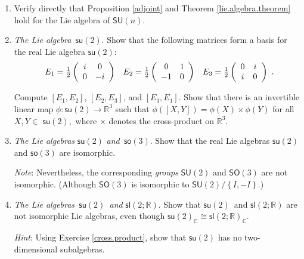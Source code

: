 \documentclass{amsbook}
\theoremstyle{plain}
\numberwithin{equation}{chapter}
\numberwithin{theorem}{chapter}
\begin{document}
\begin{enumerate}
\item  Verify directly that Proposition \ref{adjoint} and Theorem
\ref{lie.algebra.theorem} hold for the Lie algebra of $\mathsf{SU}(n)$.

\item \label{cross.product}\textit{The Lie algebra}\emph{\ }$\mathsf{su}(2)$.
Show that the following matrices form a basis for the real Lie algebra
$\mathsf{su}(2)$:
\[%
\begin{array}
[c]{ccc}%
E_{1}=\tfrac{1}{2}\left(
\begin{array}
[c]{cc}%
i & 0\\
0 & -i
\end{array}
\right)   & E_{2}=\tfrac{1}{2}\left(
\begin{array}
[c]{cc}%
0 & 1\\
-1 & 0
\end{array}
\right)   & E_{3}=\tfrac{1}{2}\left(
\begin{array}
[c]{cc}%
0 & i\\
i & 0
\end{array}
\right)
\end{array}
\text{.}%
\]

Compute $[E_{1},E_{2}]$, $[E_{2},E_{3}]$, and $[E_{3},E_{1}]$. Show that there
is an invertible linear map $\phi:\mathsf{su}(2)\rightarrow\mathbb{R}^{3}$
such that $\phi(\left[  X,Y\right]  )=\phi(X)\times\phi(Y)$ for all $X,Y\in$
$\mathsf{su}(2),$ where $\times$ denotes the cross-product on $\mathbb{R}^{3}$.

\item \label{su2.iso.so3}\textit{The Lie algebras }$\mathsf{su}(2)$
\textit{and}\emph{\ }$\mathsf{so}(3)$. Show that the real Lie algebras
$\mathsf{su}(2)$ and $\mathsf{so}(3)$ are isomorphic.

\textit{Note}: Nevertheless, the corresponding \textit{groups} $\mathsf{SU}%
(2)$ and $\mathsf{SO}(3)$ are not isomorphic. (Although $\mathsf{SO}(3)$ is
isomorphic to $\mathsf{SU}(2)/\left\{  I,-I\right\}  $.)

\item \label{real.forms}\textit{The Lie algebras}\emph{\ }$\mathsf{su}%
(2)$\emph{\ \textit{and} }$\mathsf{sl}(2;\mathbb{R})$. Show that
$\mathsf{su}(2)$\emph{\ }and $\mathsf{sl}(2;\mathbb{R})$ are not isomorphic
Lie algebras, even though $\mathsf{su}(2)_{\mathbb{C}}\cong\mathsf{sl}%
(2;\mathbb{R})_{\mathbb{C}}$.

\textit{Hint}: Using Exercise \ref{cross.product}, show that $\mathsf{su}(2)$
has no two-dimensional subalgebras.


\end{enumerate}
\end{document}
